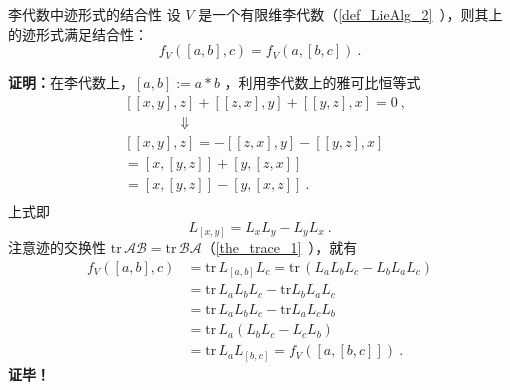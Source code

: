 \begin{theorem}{李代数中迹形式的结合性}\label{the_STAlg_1}
设 $V$ 是一个有限维李代数（\autoref{def_LieAlg_2}~），则其上的迹形式满足结合性：
\begin{equation}
f_V([a,b],c)=f_V(a,[b,c])~.
\end{equation}
\end{theorem}
\textbf{证明：}在李代数上，$[a,b]:=a*b$ ，利用李代数上的雅可比恒等式
\begin{equation}
\begin{aligned}
&[[x,y],z]+[[z,x],y]+[[y,z],x]=0~,\\
&\qquad\qquad\Downarrow\\
&[[x,y],z]=-[[z,x],y]-[[y,z],x]\\
&=[x,[y,z]]+[y,[z,x]]\\
&=[x,[y,z]]-[y,[x,z]]~.\\
\end{aligned}
\end{equation}
上式即
\begin{equation}
L_{[x,y]}=L_xL_y-L_yL_x~.
\end{equation}
注意迹的交换性 $\mathrm{tr}\, \mathcal A\mathcal B=\mathrm{tr}\, \mathcal B\mathcal A$（\autoref{the_trace_1}~），就有
\begin{equation}
\begin{aligned}
f_V([a,b],c)&=\mathrm{tr}\,L_{[a,b]}L_c=\mathrm{tr}\,(L_aL_bL_c-L_bL_aL_c)\\
&=\mathrm{tr}\,L_aL_bL_c-\mathrm{tr}L_bL_aL_c\\
&=\mathrm{tr}\,L_aL_bL_c-\mathrm{tr}L_aL_cL_b\\
&=\mathrm{tr}\,L_a(L_bL_c-L_cL_b)\\
&=\mathrm{tr}\,L_aL_{[b,c]}=f_V([a,[b,c]])~.
\end{aligned}
\end{equation}
\textbf{证毕！}


